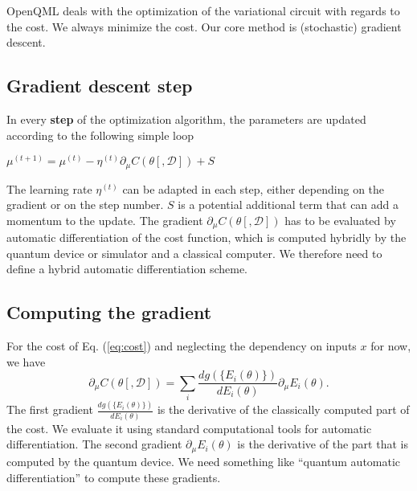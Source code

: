 \documentclass[amsmath,amssymb,aps,pra,10pt,twocolumn,groupedaddress,nofootinbib]{revtex4-1}
\begin{document}
OpenQML deals with the optimization of the variational circuit with regards to the cost. We always minimize the cost. Our core method is (stochastic) gradient descent. 

\subsection{Gradient descent step}
In every \textbf{step} of the optimization algorithm, the parameters are updated according to the following simple loop\\

\begin{algorithmic}[1]
\For {$\mu \in \theta $} 
\State $\mu^{(t+1)} = \mu^{(t)} - \eta^{(t)} \partial_{\mu} C(\theta[, \mathcal{D}]) + S$
\EndFor
\EndProcedure
\end{algorithmic}

The learning rate $\eta^{(t)}$ can be adapted in each step, either depending on the gradient or on the step number. $S$ is a potential additional term that can add a momentum to the update. The gradient $\partial_{\mu} C(\theta[, \mathcal{D}])$ has to be evaluated by automatic differentiation of the cost function, which is computed hybridly by the quantum device or simulator and a classical computer. We therefore need to define a hybrid automatic differentiation scheme.

\subsection{Computing the gradient}
For the cost of Eq. (\ref{eq:cost}) and neglecting the dependency on inputs $x$ for now, we have
\[\partial_{\mu} C(\theta[, \mathcal{D}]) = \sum_i \frac{d g(\{E_i(\theta)\})}{d E_i(\theta)} \partial_{\mu} E_i(\theta). \]
The first gradient $\frac{d g(\{E_i(\theta)\})}{d E_i(\theta)}$ is the derivative of the classically computed part of the cost. We evaluate it using standard computational tools for automatic differentiation. The second gradient $\partial_{\mu} E_i(\theta)$ is the derivative of the part that is computed by the quantum device. We need something like ``quantum automatic differentiation'' to compute these gradients.\\
\end{document}
